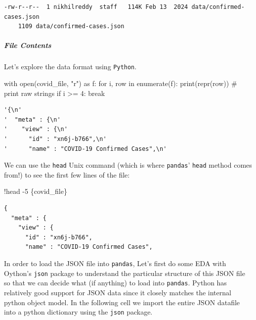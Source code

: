\documentclass[
  letterpaper,
  DIV=11,
  numbers=noendperiod]{scrreprt}
\let\oldsubparagraph\subparagraph
\renewcommand{\subparagraph}[1]{\oldsubparagraph{#1}\mbox{}}
\newenvironment{Shaded}{\begin{snugshade}}{\end{snugshade}}
\newcommand{\BuiltInTok}[1]{\textcolor[rgb]{0.00,0.23,0.31}{#1}}
\newcommand{\CommentTok}[1]{\textcolor[rgb]{0.37,0.37,0.37}{#1}}
\newcommand{\ControlFlowTok}[1]{\textcolor[rgb]{0.00,0.23,0.31}{#1}}
\newcommand{\DecValTok}[1]{\textcolor[rgb]{0.68,0.00,0.00}{#1}}
\newcommand{\ImportTok}[1]{\textcolor[rgb]{0.00,0.46,0.62}{#1}}
\newcommand{\KeywordTok}[1]{\textcolor[rgb]{0.00,0.23,0.31}{#1}}
\newcommand{\NormalTok}[1]{\textcolor[rgb]{0.00,0.23,0.31}{#1}}
\newcommand{\OperatorTok}[1]{\textcolor[rgb]{0.37,0.37,0.37}{#1}}
\newcommand{\StringTok}[1]{\textcolor[rgb]{0.13,0.47,0.30}{#1}}
\begin{document}
\begin{verbatim}
-rw-r--r--  1 nikhilreddy  staff   114K Feb 13  2024 data/confirmed-cases.json
    1109 data/confirmed-cases.json
\end{verbatim}

\subparagraph{File Contents}\label{file-contents}

Let's explore the data format using \texttt{Python}.

\begin{Shaded}
\begin{Highlighting}[]
\ControlFlowTok{with} \BuiltInTok{open}\NormalTok{(covid\_file, }\StringTok{"r"}\NormalTok{) }\ImportTok{as}\NormalTok{ f:}
    \ControlFlowTok{for}\NormalTok{ i, row }\KeywordTok{in} \BuiltInTok{enumerate}\NormalTok{(f):}
        \BuiltInTok{print}\NormalTok{(}\BuiltInTok{repr}\NormalTok{(row)) }\CommentTok{\# print raw strings}
        \ControlFlowTok{if}\NormalTok{ i }\OperatorTok{\textgreater{}=} \DecValTok{4}\NormalTok{: }\ControlFlowTok{break}
\end{Highlighting}
\end{Shaded}

\begin{verbatim}
'{\n'
'  "meta" : {\n'
'    "view" : {\n'
'      "id" : "xn6j-b766",\n'
'      "name" : "COVID-19 Confirmed Cases",\n'
\end{verbatim}

We can use the \texttt{head} Unix command (which is where
\texttt{pandas}' \texttt{head} method comes from!) to see the first few
lines of the file:

\begin{Shaded}
\begin{Highlighting}[]
\OperatorTok{!}\NormalTok{head }\OperatorTok{{-}}\DecValTok{5}\NormalTok{ \{covid\_file\}}
\end{Highlighting}
\end{Shaded}

\begin{verbatim}
{
  "meta" : {
    "view" : {
      "id" : "xn6j-b766",
      "name" : "COVID-19 Confirmed Cases",
\end{verbatim}

In order to load the JSON file into \texttt{pandas}, Let's first do some
EDA with Oython's \texttt{json} package to understand the particular
structure of this JSON file so that we can decide what (if anything) to
load into \texttt{pandas}. Python has relatively good support for JSON
data since it closely matches the internal python object model. In the
following cell we import the entire JSON datafile into a python
dictionary using the \texttt{json} package.
\end{document}
